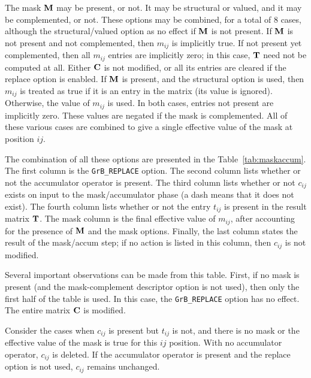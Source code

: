 \documentclass[12pt]{article}
\begin{document}
{The mask ${\bf M}$ may be present, or not.  It may be structural or valued, and
it may be complemented, or not.  These options may be combined, for a total of
8 cases, although the structural/valued option as no effect if ${\bf M}$ is not
present.  If ${\bf M}$ is not present and not complemented, then $m_{ij}$ is
implicitly true.  If not present yet complemented, then all $m_{ij}$ entries are
implicitly zero; in this case, ${\bf T}$ need not be computed at all.  Either
${\bf C}$ is not modified, or all its entries are cleared if the replace option
is enabled.  If ${\bf M}$ is present, and the structural option is used, then
$m_{ij}$ is treated as true if it is an entry in the matrix (its value is
ignored).  Otherwise, the value of $m_{ij}$ is used.  In both cases, entries
not present are implicitly zero.  These values are negated if the mask is
complemented.  All of these various cases are combined to give a single
effective value of the mask at position ${ij}$.

The combination of all these options are presented in the
Table~\ref{tab:maskaccum}.  The first column is the \verb'GrB_REPLACE' option.
The second column lists whether or not the accumulator operator is present.
The third column lists whether or not $c_{ij}$ exists on input to the
mask/accumulator phase (a dash means that it does not exist).  The fourth
column lists whether or not the entry $t_{ij}$ is present in the result matrix
${\bf T}$.  The mask column is the final effective value of $m_{ij}$, after
accounting for the presence of ${\bf M}$ and the mask options.  Finally, the
last column states the result of the mask/accum step; if no action is listed in
this column, then $c_{ij}$ is not modified.

Several important observations can be made from this table.  First,
if no mask is present (and the mask-complement descriptor option is not used),
then only the first half of the table is used.  In this case, the \verb'GrB_REPLACE'
option has no effect.  The entire matrix ${\bf C}$ is modified.

Consider the cases when $c_{ij}$ is present but $t_{ij}$ is not, and there is no
mask or the effective value of the mask is true for this ${ij}$ position.  With
no accumulator operator, $c_{ij}$ is deleted.  If the accumulator operator is
present and the replace option is not used, $c_{ij}$ remains unchanged.

}
\end{document}
